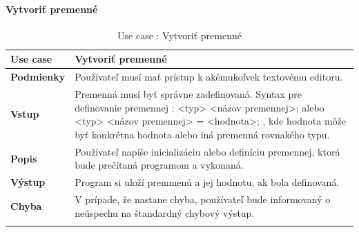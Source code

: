 \paragraph{Vytvoriť premenné}
\begin{center}
	\begin{longtable}{|p{2.5cm}|p{12.2cm}|}
		
			\hline
			\textbf{Use case} & Vytvoriť premenné \\ 
			\hline
			\textbf{Podmienky} & Používateľ musí mať prístup k akémukoľvek textovému editoru.  \\ 
			\hline
			\textbf{Vstup} & Premenná musí byť správne zadefinovaná. 
			\newline
			Syntax pre definovanie premennej : 
			\newline
			<typ> <názov premennej>; alebo 
			\newline
			 <typ> <názov premennej> = <hodnota>;
			 \newline
			 , kde hodnota môže byť konkrétna hodnota alebo iná premenná rovnakého typu.\\
			\hline
			\textbf{Popis} & Používateľ napíše inicializáciu alebo definíciu premennej, ktorá bude prečítaná programom a vykonaná.\\ 
			\hline
			\textbf{Výstup} & Program si uloží premmenú a jej hodnotu, ak bola definovaná.\\
			\hline
			\textbf{Chyba} & V prípade, že nastane chyba, používateľ bude informovaný o neúspechu na štandardný chybový výstup.\\
			\hline
			\caption{Use case : Vytvoriť premenné}
		\label{table:1}
	
	\end{longtable}
\end{center}
